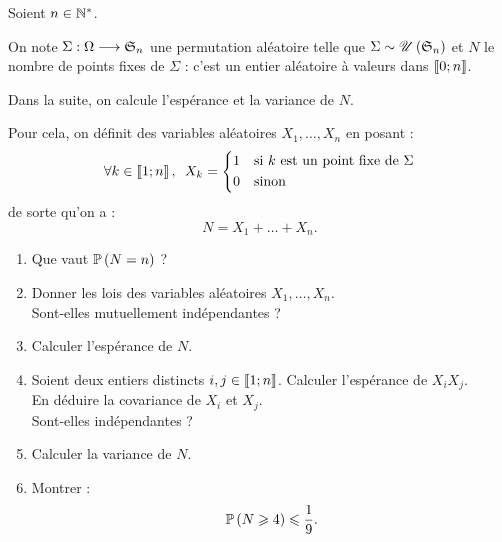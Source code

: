 \begin{exo}[Exercice 12]
Soient \(n\in\Ns\).

On note \(\Sigma:\Omega\to\S{n}\) une permutation aléatoire telle que \(\Sigma\sim\loiuniforme{\S{n}}\) et \(N\) le nombre de points fixes de \(\Sigma\) : c'est un entier aléatoire à valeurs dans \(\interventierii{0}{n}\).

Dans la suite, on calcule l'espérance et la variance de \(N\).

Pour cela, on définit des variables aléatoires \(X_1,\dots,X_n\) en posant : \[\quantifs{\forall k\in\interventierii{1}{n}}X_k=\begin{dcases}
1 &\text{si }k\text{ est un point fixe de }\Sigma \\
0 &\text{sinon}
\end{dcases}\] de sorte qu'on a : \[N=X_1+\dots+X_n.\]

\begin{enumerate}
    \item Que vaut \(\proba{N=n}\) ? \\
    \item Donner les lois des variables aléatoires \(X_1,\dots,X_n\). \\ Sont-elles mutuellement indépendantes ? \\
    \item Calculer l'espérance de \(N\). \\
    \item Soient deux entiers distincts \(i,j\in\interventierii{1}{n}\). Calculer l'espérance de \(X_iX_j\). \\ En déduire la covariance de \(X_i\) et \(X_j\). \\ Sont-elles indépendantes ? \\
    \item Calculer la variance de \(N\). \\
    \item Montrer : \[\proba{N\geq4}\leq\dfrac{1}{9}.\]
\end{enumerate}
\end{exo}

\begin{corr}
\end{corr}